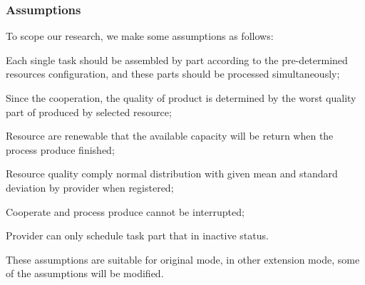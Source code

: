 \subsubsection{Assumptions} %
\label{ssub:assumptions_nomenclature}
To scope our research, we make some assumptions as follows:
\begin{compactitem}
\item Each single task should be assembled by part according to the pre-determined resources configuration, and these parts should be processed simultaneously;
\item Since the cooperation, the quality of product is determined by the worst quality part of produced by selected resource;
\item Resource are renewable that the available capacity will be return when the process produce finished;
\item Resource quality comply normal distribution with given mean and standard deviation by provider when registered;
\item Cooperate and process produce cannot be interrupted;
\item Provider can only schedule task part that in inactive status. 
\end{compactitem}
These assumptions are suitable for original mode, in other extension mode, some of the assumptions will be modified.

